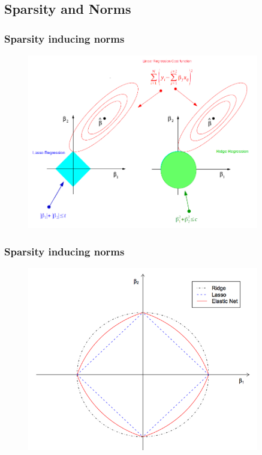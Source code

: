 \documentclass{beamer}
\theoremstyle{plain}
\theoremstyle{definition}
\begin{document}
\subsection{Sparsity and Norms}
\begin{frame}
\frametitle{Sparsity inducing norms}
\begin{figure}
\centering
\includegraphics[width = 0.9\textwidth]{figures/lasso_ridge_regression.png}
\end{figure}
\end{frame}

\begin{frame}
\frametitle{Sparsity inducing norms}
\begin{figure}
\centering
\includegraphics[width = 0.9\textwidth]{figures/lasso_ridge_regression_constraint_region.png}
\end{figure}
\end{frame}
\end{document}
